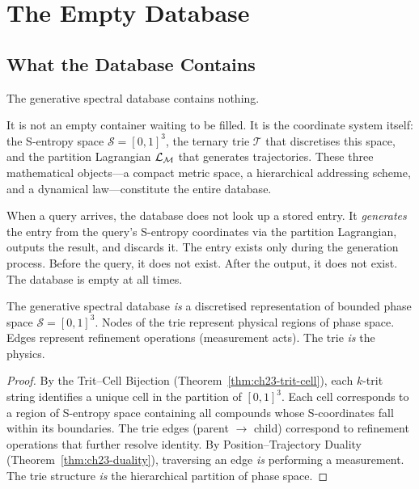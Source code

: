 \section{The Empty Database}
\label{sec:ch23-empty}

\subsection{What the Database Contains}
\label{sec:ch23-contains}

The generative spectral database contains nothing.

It is not an empty container waiting to be filled.  It is the coordinate
system itself: the S-entropy space $\mathcal{S} = [0,1]^3$, the ternary trie
$\mathcal{T}$ that discretises this space, and the partition Lagrangian
$\mathcal{L}_{\mathcal{M}}$ that generates trajectories.  These three mathematical
objects---a compact metric space, a hierarchical addressing scheme, and a
dynamical law---constitute the entire database.

When a query arrives, the database does not look up a stored entry.  It
\emph{generates} the entry from the query's S-entropy coordinates via the
partition Lagrangian, outputs the result, and discards it.  The entry exists
only during the generation process.  Before the query, it does not exist.
After the output, it does not exist.  The database is empty at all times.

\begin{theorem}
\label{thm:ch23-phase-space}
The generative spectral database \emph{is} a discretised representation of
bounded phase space $\mathcal{S} = [0,1]^3$.  Nodes of the trie represent
physical regions of phase space.  Edges represent refinement operations
(measurement acts).  The trie \emph{is} the physics.
\end{theorem}

\begin{proof}
By the Trit--Cell Bijection (Theorem~\ref{thm:ch23-trit-cell}), each $k$-trit
string identifies a unique cell in the partition of $[0,1]^3$.  Each cell
corresponds to a region of S-entropy space containing all compounds whose
S-coordinates fall within its boundaries.  The trie edges (parent $\to$ child)
correspond to refinement operations that further resolve identity.  By
Position--Trajectory Duality (Theorem~\ref{thm:ch23-duality}), traversing an
edge \emph{is} performing a measurement.  The trie structure \emph{is} the
hierarchical partition of phase space.
\end{proof}

